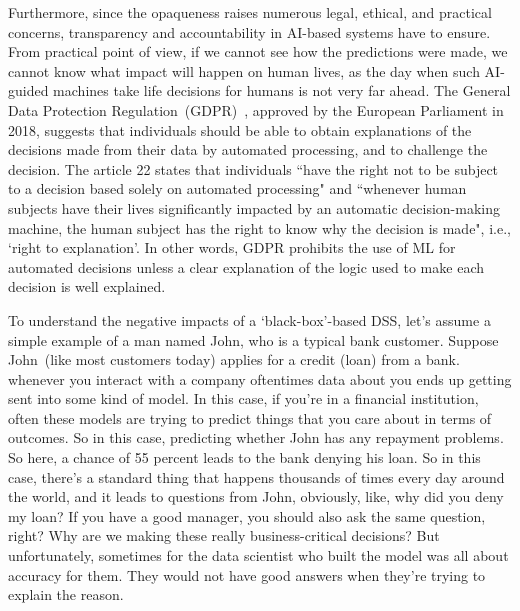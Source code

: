 \hspace*{3.5mm} Furthermore, since the opaqueness raises numerous legal, ethical, and practical concerns, transparency and accountability in AI-based systems have to ensure. From practical point of view, if we cannot see how the predictions were made, we cannot know what impact will happen on human lives, as the day when such AI-guided machines take life decisions for humans is not very far ahead. The General Data Protection Regulation~(GDPR)~\cite{kaminski2019right}, approved by the European Parliament in 2018, suggests that individuals should be able to obtain explanations of the decisions made from their data by automated processing, and to challenge the decision. The article 22 states that individuals ``have the right not to be subject to a decision based solely on automated processing" and ``whenever human subjects have their lives significantly impacted by an automatic decision-making machine, the human subject has the right to know why the decision is made", i.e., `right to explanation'. In other words, GDPR prohibits the use of ML for automated decisions unless a clear explanation of the logic used to make each decision is well explained. 

\hspace*{3.5mm} To understand the negative impacts of a `black-box'-based DSS, let's assume a simple example of a man named John, who is a typical bank customer. Suppose John~(like most customers today) applies for a credit (loan) from a bank. whenever you interact with a company oftentimes data about you ends up getting sent into some kind of model. In this case, if you're in a financial institution, often these models are trying to predict 
things that you care about in terms of outcomes. So in this case, predicting whether John has any repayment problems. So here, a chance of 55 percent leads to the bank denying his loan. So in this case, there's a standard thing that happens thousands of times every day around the world, and it leads to questions from John, obviously, like, why did you deny my loan? If you have a good manager, you should also ask the same question, right? Why are we making these really business-critical decisions? But unfortunately, sometimes for the data scientist who built the model was all about accuracy for them. They would not have good answers when they're trying to explain the reason.

